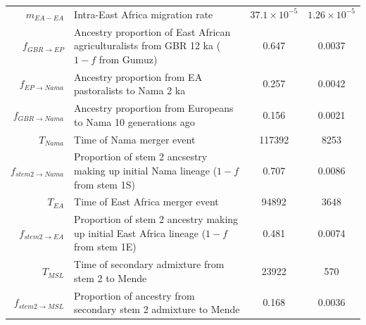 \documentclass[]{article}
\begin{document}
\begin{table}[ht]
\begin{tabular}[t]{rP{8cm}cc}
    $m_{EA-EA}$ & Intra-East Africa migration rate & $37.1\times10^{-5}$ & $1.26\times10^{-5}$ \\
    $f_{GBR \rightarrow EP}$ & Ancestry proportion of East African agriculturalists from GBR 12 ka ($1-f$ from Gumuz) & 0.647 & 0.0037 \\
    $f_{EP \rightarrow Nama}$ & Ancestry proportion from EA pastoralists to Nama 2 ka & 0.257 & 0.0042 \\
    $f_{GBR \rightarrow Nama}$ & Ancestry proportion from Europeans to Nama 10 generations ago & 0.156 & 0.0021 \\
    $T_{Nama}$ & Time of Nama merger event & 117392 & 8253 \\
    $f_{stem 2 \rightarrow Nama}$ & Proportion of stem 2 ancsestry making up initial Nama lineage ($1-f$ from stem 1S) & 0.707 & 0.0086 \\
    $T_{EA}$ & Time of East Africa merger event & 94892 & 3648 \\
    $f_{stem 2 \rightarrow EA}$ & Proportion of stem 2 ancestry making up initial East Africa lineage ($1-f$ from stem 1E) & 0.481 & 0.0074 \\
    $T_{MSL}$ & Time of secondary admixture from stem 2 to Mende & 23922 & 570 \\
    $f_{stem 2 \rightarrow MSL}$ & Proportion of ancestry from secondary stem 2 admixture to Mende & 0.168 & 0.0036 \\
    \bottomrule
\end{tabular}
\end{table}
\end{document}
